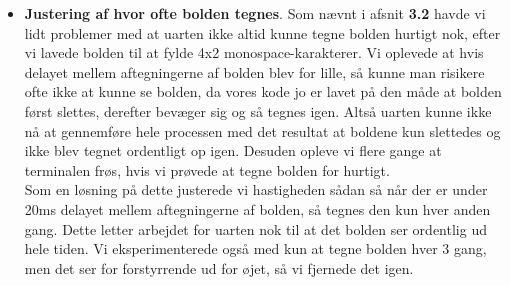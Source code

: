 \begin{itemize}
\item \textbf{Justering af hvor ofte bolden tegnes}. Som nævnt i afsnit \textbf{3.2} havde vi lidt problemer med at uarten ikke altid kunne tegne bolden hurtigt nok, efter vi lavede bolden til at fylde 4x2 monospace-karakterer. Vi oplevede at hvis delayet mellem aftegningerne af bolden blev for lille, så kunne man risikere ofte ikke at kunne se bolden, da vores kode jo er lavet på den måde at bolden først slettes, derefter bevæger sig og så tegnes igen. Altså uarten kunne ikke nå at gennemføre hele processen med det resultat at boldene kun slettedes og ikke blev tegnet ordentligt op igen. Desuden opleve vi flere gange at terminalen frøs, hvis vi prøvede at tegne bolden for hurtigt.\\
Som en løsning på dette justerede vi hastigheden sådan så når der er under 20ms delayet mellem aftegningerne af bolden, så tegnes den kun hver anden gang. Dette letter arbejdet for uarten nok til at det bolden ser ordentlig ud hele tiden. Vi eksperimenterede også med kun at tegne bolden hver 3 gang, men det ser for forstyrrende ud for øjet, så vi fjernede det igen.

\end{itemize}
